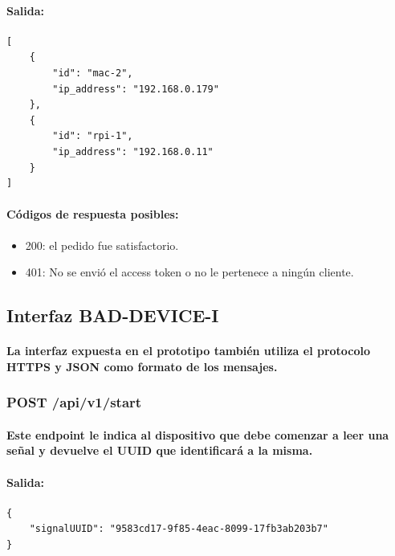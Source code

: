 \documentclass{article}
\begin{document}
\paragraph{
Salida:
}

\begin{verbatim}
[
    {
        "id": "mac-2",
        "ip_address": "192.168.0.179"
    },
    {
        "id": "rpi-1",
        "ip_address": "192.168.0.11"
    }
]

\end{verbatim}

\paragraph{
Códigos de respuesta posibles:
}
\begin{itemize}
    \item 200: el pedido fue satisfactorio.
    \item 401: No se envió el access token o no le pertenece a ningún cliente.
\end{itemize}

\subsection{Interfaz BAD-DEVICE-I}
\paragraph{
La interfaz expuesta en el prototipo también utiliza el protocolo HTTPS y JSON como formato de los mensajes.
}
\subsubsection{POST /api/v1/start}
\paragraph{
Este endpoint le indica al dispositivo que debe comenzar a leer una señal y devuelve el UUID que identificará a la misma.
}
\paragraph{
Salida:}

\begin{verbatim}
{
    "signalUUID": "9583cd17-9f85-4eac-8099-17fb3ab203b7"
}
\end{verbatim}
\end{document}
